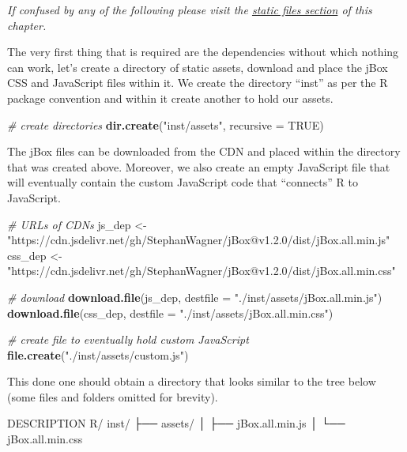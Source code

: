 \documentclass[
]{krantz}
\makeatletter
\newenvironment{Shaded}{\begin{snugshade}}{\end{snugshade}}
\newcommand{\CommentTok}[1]{\textcolor[rgb]{0.37,0.37,0.37}{\textit{#1}}}
\newcommand{\DataTypeTok}[1]{\textcolor[rgb]{0.27,0.27,0.27}{#1}}
\newcommand{\ExtensionTok}[1]{#1}
\newcommand{\KeywordTok}[1]{\textcolor[rgb]{0.27,0.27,0.27}{\textbf{#1}}}
\newcommand{\NormalTok}[1]{#1}
\newcommand{\OtherTok}[1]{\textcolor[rgb]{0.37,0.37,0.37}{#1}}
\newcommand{\StringTok}[1]{\textcolor[rgb]{0.5,0.5,0.5}{#1}}
\newenvironment{kframe}{%
\medskip{}
\setlength{\fboxsep}{.8em}
 \def\at@end@of@kframe{}%
 \ifinner\ifhmode%
  \def\at@end@of@kframe{\end{minipage}}%
  \begin{minipage}{\columnwidth}%
 \fi\fi%
 \def\FrameCommand##1{\hskip\@totalleftmargin \hskip-\fboxsep
 \colorbox{shadecolor}{##1}\hskip-\fboxsep
     \hskip-\linewidth \hskip-\@totalleftmargin \hskip\columnwidth}%
 \MakeFramed {\advance\hsize-\width
   \@totalleftmargin\z@ \linewidth\hsize
   \@setminipage}}%
 {\par\unskip\endMakeFramed%
 \at@end@of@kframe}
\renewenvironment{Shaded}{\begin{kframe}}{\end{kframe}}
\makeatother
\begin{document}
\emph{If confused by any of the following please visit the \protect\hyperlink{static-files}{static files section} of this chapter.}

The very first thing that is required are the dependencies without which nothing can work, let's create a directory of static assets, download and place the jBox CSS and JavaScript files within it. We create the directory ``inst'' as per the R package convention and within it create another to hold our assets.

\begin{Shaded}
\begin{Highlighting}[]
\CommentTok{\# create directories}
\KeywordTok{dir.create}\NormalTok{(}\StringTok{"inst/assets"}\NormalTok{, }\DataTypeTok{recursive =} \OtherTok{TRUE}\NormalTok{)}
\end{Highlighting}
\end{Shaded}

The jBox files can be downloaded from the CDN and placed within the directory that was created above. Moreover, we also create an empty JavaScript file that will eventually contain the custom JavaScript code that ``connects'' R to JavaScript.

\begin{Shaded}
\begin{Highlighting}[]
\CommentTok{\# URLs of CDNs}
\NormalTok{js\_dep <{-}}\StringTok{ "https://cdn.jsdelivr.net/gh/StephanWagner/jBox@v1.2.0/dist/jBox.all.min.js"}
\NormalTok{css\_dep <{-}}\StringTok{ "https://cdn.jsdelivr.net/gh/StephanWagner/jBox@v1.2.0/dist/jBox.all.min.css"}

\CommentTok{\# download}
\KeywordTok{download.file}\NormalTok{(js\_dep, }\DataTypeTok{destfile =} \StringTok{"./inst/assets/jBox.all.min.js"}\NormalTok{)}
\KeywordTok{download.file}\NormalTok{(css\_dep, }\DataTypeTok{destfile =} \StringTok{"./inst/assets/jBox.all.min.css"}\NormalTok{)}

\CommentTok{\# create file to eventually hold custom JavaScript}
\KeywordTok{file.create}\NormalTok{(}\StringTok{"./inst/assets/custom.js"}\NormalTok{)}
\end{Highlighting}
\end{Shaded}

This done one should obtain a directory that looks similar to the tree below (some files and folders omitted for brevity).

\begin{Shaded}
\begin{Highlighting}[]
\ExtensionTok{DESCRIPTION}
\ExtensionTok{R/}
\ExtensionTok{inst/}
\NormalTok{├── }\ExtensionTok{assets/}
\NormalTok{│    ├── }\ExtensionTok{jBox.all.min.js}
\NormalTok{│    └── }\ExtensionTok{jBox.all.min.css}
\end{Highlighting}
\end{Shaded}
\end{document}
